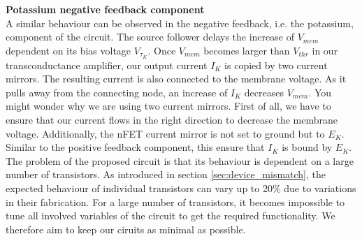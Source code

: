 \textbf{Potassium negative feedback component}\\

A similar behaviour can be observed in the negative feedback, i.e. the potassium, component of the circuit. The source follower delays the increase of $V_{mem}$ dependent on its bias voltage $V_{\tau_K}$. Once $V_{mem}$ becomes larger than $V_{thr}$ in our transconductance amplifier, our output current $I_K$ is copied by two current mirrors. The resulting current is also connected to the membrane voltage. As it pulls away from the connecting node, an increase of $I_K$ decreases $V_{mem}$. You might wonder why we are using two current mirrors. First of all, we have to ensure that our current flows in the right direction to decrease the membrane voltage. Additionally, the nFET current mirror is not set to ground but to $E_K$. Similar to the positive feedback component, this ensure that $I_K$ is bound by $E_K$.\\

The problem of the proposed circuit is that its behaviour is dependent on a large number of transistors. As introduced in section \ref{sec:device_mismatch}, the expected behaviour of individual transistors can vary up to 20\% due to variations in their fabrication. For a large number of transistors, it becomes impossible to tune all involved variables of the circuit to get the required functionality. We therefore aim to keep our ciruits as minimal as possible.